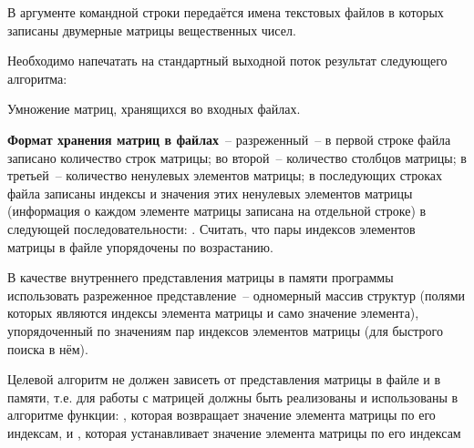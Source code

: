 
В аргументе командной строки передаётся имена текстовых файлов
в которых записаны двумерные матрицы
вещественных чисел.

Необходимо напечатать на стандартный выходной
поток результат следующего алгоритма:

Умножение матриц, хранящихся во входных файлах.

\textbf{Формат хранения матриц в файлах}~--
разреженный~-- в первой строке файла записано количество строк
матрицы; во второй~-- количество столбцов матрицы; в третьей~--
количество ненулевых элементов матрицы; в последующих строках
файла записаны индексы и значения этих ненулевых элементов
матрицы (информация о каждом элементе матрицы записана на
отдельной строке) в следующей последовательности: 
 . Считать, что пары индексов
элементов матрицы в файле упорядочены по возрастанию.

В качестве внутреннего представления матрицы в памяти программы
использовать разреженное представление~-- одномерный массив структур (полями
которых являются индексы элемента матрицы и само значение
элемента), упорядоченный по значениям пар индексов элементов
матрицы (для быстрого поиска в нём).

Целевой алгоритм не
должен зависеть от представления матрицы в файле и в памяти, т.е. для
работы с матрицей должны быть реализованы и использованы в алгоритме
функции: , которая возвращает
значение элемента матрицы по его индексам, и , которая устанавливает значение элемента
матрицы по его индексам
